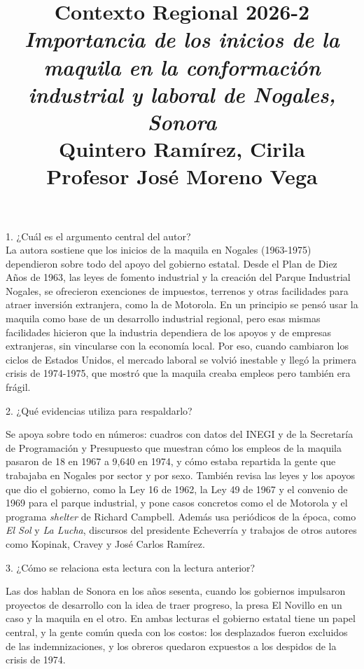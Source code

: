 \documentclass[a4paper, 11pt]{article}
\title
{
    \textbf{Contexto Regional 2026-2} \\[0.3cm]
    {\large \textit{Importancia de los inicios de la maquila en la conformación industrial y laboral de Nogales, Sonora}} \\[0.2cm]
    {\normalsize Quintero Ramírez, Cirila} \\[0.3cm]
    {\normalsize Profesor José Moreno Vega}
}
\date{}
\begin{document}
\begin{otherlanguage}{spanish}
\maketitle
\end{otherlanguage}
\thispagestyle{fancy}
\vspace{-0.5cm}


{\Large 1. ¿Cuál es el argumento central del autor?} \\
{\color{azul}
    La autora sostiene que los inicios de la maquila en Nogales (1963-1975) dependieron sobre todo del apoyo del gobierno estatal. Desde el Plan de Diez Años de 1963, las leyes de fomento industrial y la creación del Parque Industrial Nogales, se ofrecieron exenciones de impuestos, terrenos y otras facilidades para atraer inversión extranjera, como la de Motorola. En un principio se pensó usar la maquila como base de un desarrollo industrial regional, pero esas mismas facilidades hicieron que la industria dependiera de los apoyos y de empresas extranjeras, sin vincularse con la economía local. Por eso, cuando cambiaron los ciclos de Estados Unidos, el mercado laboral se volvió inestable y llegó la primera crisis de 1974-1975, que mostró que la maquila creaba empleos pero también era frágil.
}
\vspace{1cm}

{\Large 2. ¿Qué evidencias utiliza para respaldarlo?} \par
{\color{azul}
Se apoya sobre todo en números: cuadros con datos del INEGI y de la Secretaría de Programación y Presupuesto que muestran cómo los empleos de la maquila pasaron de 18 en 1967 a 9,640 en 1974, y cómo estaba repartida la gente que trabajaba en Nogales por sector y por sexo. También revisa las leyes y los apoyos que dio el gobierno, como la Ley 16 de 1962, la Ley 49 de 1967 y el convenio de 1969 para el parque industrial, y pone casos concretos como el de Motorola y el programa \textit{shelter} de Richard Campbell. Además usa periódicos de la época, como \textit{El Sol} y \textit{La Lucha}, discursos del presidente Echeverría y trabajos de otros autores como Kopinak, Cravey y José Carlos Ramírez.
}
\vspace{1cm}

{\Large 3. ¿Cómo se relaciona esta lectura con la lectura anterior?} \par
{\color{azul}
Las dos hablan de Sonora en los años sesenta, cuando los gobiernos impulsaron proyectos de desarrollo con la idea de traer progreso, la presa El Novillo en un caso y la maquila en el otro. En ambas lecturas el gobierno estatal tiene un papel central, y la gente común queda con los costos: los desplazados fueron excluidos de las indemnizaciones, y los obreros quedaron expuestos a los despidos de la crisis de 1974.
}
\end{document}
